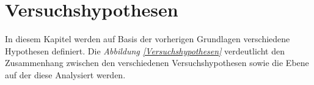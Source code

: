 \documentclass[a4paper,11pt]{article}%
\renewcommand{\\}{\vspace*{0.5\baselineskip} \newline}
\begin{document}









\section{Versuchshypothesen}
In diesem Kapitel werden auf Basis der vorherigen Grundlagen verschiedene Hypothesen definiert.
Die \textit{Abbildung \ref{Versuchshypothesen}} verdeutlicht den Zusammenhang zwischen den verschiedenen Versuchshypothesen sowie die Ebene auf der diese Analysiert werden.
\end{document}

